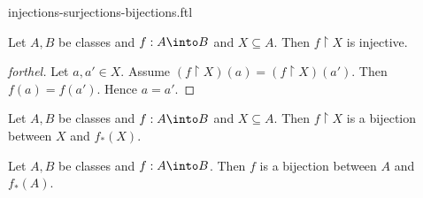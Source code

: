 \documentclass{naproche-library}
\begin{document}
\begin{smodule}{injections-surjections-bijections.ftl}
  \begin{proposition}[forthel,id=FOUNDATIONS_08_2621531811217408]
    Let $A, B$ be classes and $f : A \into B$ and $X \subseteq A$.
    Then $f \restriction X$ is injective.
  \end{proposition}
  \begin{proof}[forthel]
    Let $a, a' \in X$.
    Assume $(f \restriction X)(a) = (f \restriction X)(a')$.
    Then $f(a) = f(a')$.
    Hence $a = a'$.
  \end{proof}

  \begin{proposition}[forthel,id=FOUNDATIONS_08_647446231252992]
    Let $A, B$ be classes and $f : A \into B$ and $X \subseteq A$.
    Then $f \restriction X$ is a bijection between $X$ and $f_{*}(X)$.
  \end{proposition}

  \begin{corollary}[forthel,id=FOUNDATIONS_08_8159443759923200]
    Let $A, B$ be classes and $f : A \into B$.
    Then $f$ is a bijection between $A$ and $f_{*}(A)$.
  \end{corollary}
\end{smodule}
\end{document}
